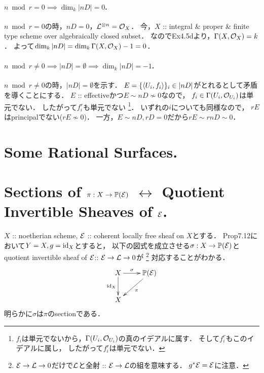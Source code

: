\documentclass[a4paper]{jsarticle}
\newcommand{\pbundle}{\mathbb{P}}
\begin{document}
    \paragraph{$n \bmod r=0 \implies \dim_k |nD|=0$.}
    $n \bmod r=0$の時，$nD=0$，$\mathcal{L}^{\otimes n}=\mathcal{O}_X$．
    今，$X$ :: integral \& proper \& finite type scheme over algebraically closed subset．
    なのでEx4.5dより，$\Gamma(X, \mathcal{O}_X)=k$．
    よって$\dim_k |nD|=\dim_k \Gamma(X, \mathcal{O}_X)-1=0$．

    \paragraph{$n \bmod r \neq 0 \implies |nD|=\emptyset \implies \dim_k |nD|=-1$.}
    $n \bmod r \neq 0$の時，$|nD|=\emptyset$を示す．
    $E=\{\langle U_i,f_i \rangle\}_i \in |nD|$がとれるとして矛盾を導くことにする．
    $E$ :: effectiveかつ$E \sim nD \not \sim 0$なので，
    $f_i \in \Gamma(U_i, \mathcal{O}_{U_i})$は単元でない．
    したがって$f_i^r$も単元でない
    \footnote
    {
        $f_i$は単元でないから，$\Gamma(U_i, \mathcal{O}_{U_i})$の真のイデアルに属す．
        そして$f_i^r$もこのイデアルに属し，
        したがって$f_i^r$は単元でない．
    }．
    いずれの$i$についても同様なので，
    $rE$はprincipalでない($rE \not \sim 0$)．
    一方，$E \sim nD, rD=0$だから$rE \sim rnD \sim 0$．

\section{Some Rational Surfaces.} %

\section{Sections of $\pi: X \to \pbundle(\shE)$
    $\leftrightarrow$ Quotient Invertible Sheaves of $\mathcal{E}$.} %

    $X$ :: noetherian scheme,
    $\mathcal{E}$ :: coherent locally free sheaf on $X$とする．
    Prop7.12において$Y=X, g=\mathrm{id}_{X}$とすると，
    以下の図式を成立させる$\sigma: X \to \pbundle(\shE)$と
    quotient invertible sheaf of $\mathcal{E} $:: $\mathcal{E} \to \mathcal{L} \to 0$が
    \footnote
    {
        $\mathcal{E} \to \mathcal{L} \to 0$だけで$\mathcal{L}$と全射 :: $\mathcal{E} \to \mathcal{L}$の組を意味する．
        $g^*\mathcal{E}=\mathcal{E}$に注意．
    }
    対応することがわかる．
    \[
        \xymatrix
        {
            X \ar[r]^-{\sigma}\ar[d]_-{\id{X}}& \pbundle(\shE) \ar[ld]^-{\pi} \\
            X
        }
    \]
    明らかに$\sigma$は$\pi$のsectionである．
    
\end{document}
